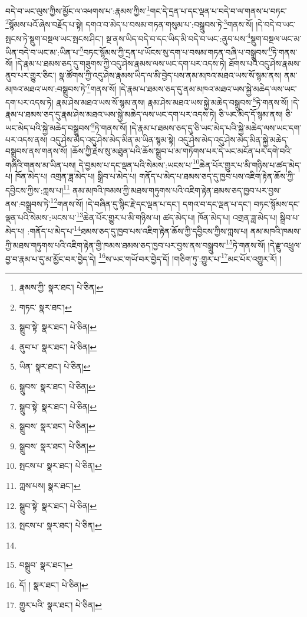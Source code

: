 བདེ་བ་ཡང་ལུས་ཀྱིས་མྱོང་ལ་འཕགས་པ་:རྣམས་ཀྱིས་\footnote{རྣམས་ཀྱི་  སྣར་ཐང་།  པེ་ཅིན། }གང་དེ་དྲན་པ་དང་ལྡན་པ་བདེ་བ་ལ་གནས་པ་བཏང་\footnote{གཏང་  སྣར་ཐང་། }སྙོམས་པའོ་ཞེས་བརྗོད་པ་སྟེ། དགའ་བ་མེད་པ་བསམ་གཏན་གསུམ་པ་:བསྒྲུབས་ཏེ་\footnote{སྒྲུབ་སྟེ་  སྣར་ཐང་།  པེ་ཅིན། }གནས་སོ། །དེ་བདེ་བ་ཡང་སྤངས་ཏེ་སྡུག་བསྔལ་ཡང་སྤངས་ཤིང་། སྔ་ནས་ཡིད་བདེ་བ་དང་ཡིད་མི་བདེ་བ་ཡང་:ནུབ་པས་\footnote{ནུབ་པ་  སྣར་ཐང་།  པེ་ཅིན། }སྡུག་བསྔལ་ཡང་མ་ཡིན་བདེ་བ་ཡང་མ་:ཡིན་པ་\footnote{ཡིན་  སྣར་ཐང་།  པེ་ཅིན། }བཏང་སྙོམས་ཀྱི་དྲན་པ་ཡོངས་སུ་དག་པ་བསམ་གཏན་བཞི་པ་བསྒྲུབས་\footnote{སྒྲུབས་  སྣར་ཐང་།  པེ་ཅིན། }ཏེ་གནས་སོ། །དེ་རྣམ་པ་ཐམས་ཅད་དུ་གཟུགས་ཀྱི་འདུ་ཤེས་རྣམས་ལས་ཡང་དག་པར་འདས་ཏེ། ཐོགས་པའི་འདུ་ཤེས་རྣམས་ནུབ་པར་གྱུར་ཅིང་། སྣ་ཚོགས་ཀྱི་འདུ་ཤེས་རྣམས་ཡིད་ལ་མི་བྱེད་པས་ནམ་མཁའ་མཐའ་ཡས་སོ་སྙམ་ནས། ནམ་མཁའ་མཐའ་ཡས་:བསྒྲུབས་ཏེ་\footnote{སྒྲུབ་སྟེ་  སྣར་ཐང་།  པེ་ཅིན། }གནས་སོ། །དེ་རྣམ་པ་ཐམས་ཅད་དུ་ནམ་མཁའ་མཐའ་ཡས་སྐྱེ་མཆེད་ལས་ཡང་དག་པར་འདས་ཏེ། རྣམ་ཤེས་མཐའ་ཡས་སོ་སྙམ་ནས། རྣམ་ཤེས་མཐའ་ཡས་སྐྱེ་མཆེད་བསྒྲུབས་\footnote{སྒྲུབས་  སྣར་ཐང་།  པེ་ཅིན། }ཏེ་གནས་སོ། །དེ་རྣམ་པ་ཐམས་ཅད་དུ་རྣམ་ཤེས་མཐའ་ཡས་སྐྱེ་མཆེད་ལས་ཡང་དག་པར་འདས་ཏེ། ཅི་ཡང་མེད་དོ་སྙམ་ནས། ཅི་ཡང་མེད་པའི་སྐྱེ་མཆེད་བསྒྲུབས་\footnote{སྒྲུབས་  སྣར་ཐང་།  པེ་ཅིན། }ཏེ་གནས་སོ། །དེ་རྣམ་པ་ཐམས་ཅད་དུ་ཅི་ཡང་མེད་པའི་སྐྱེ་མཆེད་ལས་ཡང་དག་པར་འདས་ནས། འདུ་ཤེས་མེད་འདུ་ཤེས་མེད་མིན་མ་ཡིན་སྙམ་སྟེ། འདུ་ཤེས་མེད་འདུ་ཤེས་མེད་མིན་སྐྱེ་མཆེད་བསྒྲུབས་ནས་གནས་སོ། །ཆོས་ཀྱི་རྗེས་སུ་མཐུན་པའི་ཆོས་སྒྲུབ་པ་མ་གཏོགས་པར་དེ་ཡང་མངོན་པར་དགེ་བའི་གཞིའི་གནས་མ་ཡིན་པས། དེ་བྱམས་པ་དང་ལྡན་པའི་སེམས་:ཡངས་པ་\footnote{སྤངས་པ་  སྣར་ཐང་།  པེ་ཅིན། }ཆེན་པོར་གྱུར་པ་མི་གཉིས་པ་ཚད་མེད་པ། ཁོན་མེད་པ། འགྲན་ཟླ་མེད་པ། སྒྲིབ་པ་མེད་པ། གནོད་པ་མེད་པ་ཐམས་ཅད་དུ་ཁྱབ་པས་འཇིག་རྟེན་ཆོས་ཀྱི་དབྱིངས་ཀྱིས་:ཀླས་པ།\footnote{ཀླས་པས།  སྣར་ཐང་། } ནམ་མཁའི་ཁམས་ཀྱི་མཐས་གཏུགས་པའི་འཇིག་རྟེན་ཐམས་ཅད་ཁྱབ་པར་བྱས་ནས་:བསྒྲུབས་ཏེ་\footnote{སྒྲུབ་སྟེ་  སྣར་ཐང་།  པེ་ཅིན། }གནས་སོ། །དེ་བཞིན་དུ་སྙིང་རྗེ་དང་ལྡན་པ་དང་། དགའ་བ་དང་ལྡན་པ་དང་། བཏང་སྙོམས་དང་ལྡན་པའི་སེམས་:ཡངས་པ་\footnote{སྤངས་པ་  སྣར་ཐང་།  པེ་ཅིན། }ཆེན་པོར་གྱུར་པ་མི་གཉིས་པ། ཚད་མེད་པ། ཁོན་མེད་པ། འགྲན་ཟླ་མེད་པ། སྒྲིབ་པ་མེད་པ། :གནོད་པ་མེད་པ་\footnote{}ཐམས་ཅད་དུ་ཁྱབ་པས་འཇིག་རྟེན་ཆོས་ཀྱི་དབྱིངས་ཀྱིས་ཀླས་པ། ནམ་མཁའི་ཁམས་ཀྱི་མཐས་གཏུགས་པའི་འཇིག་རྟེན་གྱི་ཁམས་ཐམས་ཅད་ཁྱབ་པར་བྱས་ནས་བསྒྲུབས་\footnote{བསྒྲུབ་  སྣར་ཐང་། }ཏེ་གནས་སོ། །དེ་རྫུ་འཕྲུལ་བྱ་བ་རྣམ་པ་དུ་མ་མྱོང་བར་བྱེད་དེ། \footnote{དོ། །   སྣར་ཐང་།  པེ་ཅིན། }ས་ཡང་གཡོ་བར་བྱེད་དོ། །གཅིག་ཏུ་:གྱུར་པ་\footnote{གྱུར་པའི་  སྣར་ཐང་།  པེ་ཅིན། }མང་པོར་འགྱུར་རོ། །
